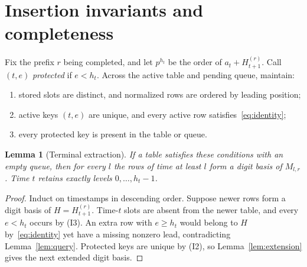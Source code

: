 \documentclass[11pt,a4paper]{article}
\theoremstyle{definition}
\theoremstyle{plain}
\newtheorem{lemma}{Lemma}
\begin{document}
\section{Insertion invariants and completeness}
Fix the prefix $r$ being completed, and let $p^{h_t}$ be the order of $a_t+H_{t+1}^{(r)}$.
Call $(t,e)$ \emph{protected} if $e<h_t$. Across the active table and pending queue, maintain:
\begin{enumerate}[label=(I\arabic*)]
\item stored slots are distinct, and normalized rows are ordered by leading position;
\item active keys $(t,e)$ are unique, and every active row satisfies~\eqref{eq:identity};
\item every protected key is present in the table or queue.
\end{enumerate}

\begin{lemma}[Terminal extraction]\label{lem:terminal}
If a table satisfies these conditions with an empty queue, then for every $l$ the rows of time
at least $l$ form a digit basis of $M_{l,r}$. Time $t$ retains exactly levels $0,\ldots,h_t-1$.
\end{lemma}
\begin{proof}
Induct on timestamps in descending order. Suppose newer rows form a digit basis of
$H=H_{t+1}^{(r)}$. Time-$t$ slots are absent from the newer table, and every $e<h_t$ occurs by (I3).
An extra row with $e\ge h_t$ would belong to $H$ by~\eqref{eq:identity} yet have a missing nonzero
lead, contradicting Lemma~\ref{lem:query}. Protected keys are unique by (I2), so
Lemma~\ref{lem:extension} gives the next extended digit basis.
\end{proof}
\end{document}
